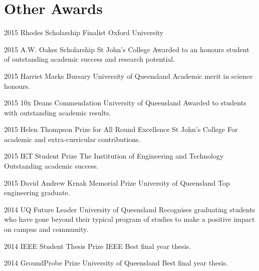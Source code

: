 \documentclass[]{friggeri-cv} %
\begin{document}
\section{Other Awards}
\begin{entrylist}
	\entryInlineSmall
	{2015}
	{Rhodes Scholarship Finalist}
	{Oxford University}
	{}
\end{entrylist}
\begin{entrylist}
	\entryInlineSmall
	{2015} %
	{A.W. Oakes Scholarship}
	{St John's College}
	{Awarded to an honours student of outstanding academic success and research potential.}
\end{entrylist}
\begin{entrylist}
	\entryInline
	{2015} %
	{Harriet Marks Bursary}
	{University of Queensland}
	{Academic merit in science honours.}
\end{entrylist}
\begin{entrylist}
	\entryInlineSmall
	{2015}
	{10x Deans Commendation}
	{University of Queensland}
	{Awarded to students with outstanding academic results.}
\end{entrylist}
\begin{entrylist}
	\entryInlineSmall
	{2015}
	{Helen Thompson Prize for All Round Excellence}
	{St John's College}
	{For academic and extra-curricular contributions.}
\end{entrylist}
\begin{entrylist}
	\entryInline
	{2015} %
	{IET Student Prize}
	{The Institution of Engineering and Technology}
	{Outstanding academic success.}
\end{entrylist}
\begin{entrylist}
	\entryInline
	{2015} %
	{David Andrew Krnak Memorial Prize}
	{University of Queensland}
	{Top engineering graduate.}
\end{entrylist}
\begin{entrylist}
	\entryInlineSmall
	{2014} %
	{UQ Future Leader}
	{University of Queensland}
	{Recognises graduating students who have gone beyond their typical program of studies to make a positive impact on campus and community.}
\end{entrylist}
\begin{entrylist}
	\entryInline
	{2014} %
	{IEEE Student Thesis Prize}
	{IEEE}
	{Best final year thesis.}
\end{entrylist}
\begin{entrylist}
	\entryInline
	{2014}
	{GroundProbe Prize}
	{University of Queensland}
	{Best final year thesis.} %
\end{entrylist}
\end{document}
